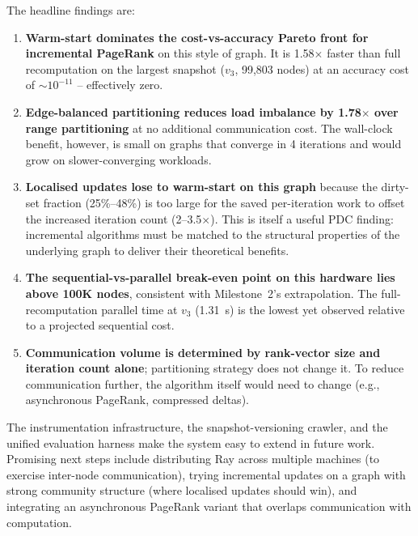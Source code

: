 \documentclass[11pt,a4paper]{article}
\begin{document}
The headline findings are:
\begin{enumerate}
    \item \textbf{Warm-start dominates the cost-vs-accuracy Pareto
    front for incremental PageRank} on this style of graph. It is
    1.58$\times$ faster than full recomputation on the largest
    snapshot ($v_3$, 99{,}803 nodes) at an accuracy cost of
    $\sim 10^{-11}$ -- effectively zero.
    \item \textbf{Edge-balanced partitioning reduces load imbalance by
    1.78$\times$ over range partitioning} at no additional
    communication cost. The wall-clock benefit, however, is small on
    graphs that converge in 4 iterations and would grow on
    slower-converging workloads.
    \item \textbf{Localised updates lose to warm-start on this graph}
    because the dirty-set fraction (25\%--48\%) is too large for the
    saved per-iteration work to offset the increased iteration count
    (2--3.5$\times$). This is itself a useful PDC finding: incremental
    algorithms must be matched to the structural properties of the
    underlying graph to deliver their theoretical benefits.
    \item \textbf{The sequential-vs-parallel break-even point on this
    hardware lies above 100K nodes}, consistent with Milestone~2's
    extrapolation. The full-recomputation parallel time at $v_3$
    (1.31~s) is the lowest yet observed relative to a projected
    sequential cost.
    \item \textbf{Communication volume is determined by rank-vector
    size and iteration count alone}; partitioning strategy does not
    change it. To reduce communication further, the algorithm itself
    would need to change (e.g., asynchronous PageRank, compressed
    deltas).
\end{enumerate}

The instrumentation infrastructure, the snapshot-versioning crawler,
and the unified evaluation harness make the system easy to extend in
future work. Promising next steps include distributing Ray across
multiple machines (to exercise inter-node communication), trying
incremental updates on a graph with strong community structure (where
localised updates should win), and integrating an asynchronous
PageRank variant that overlaps communication with computation.

\end{document}
